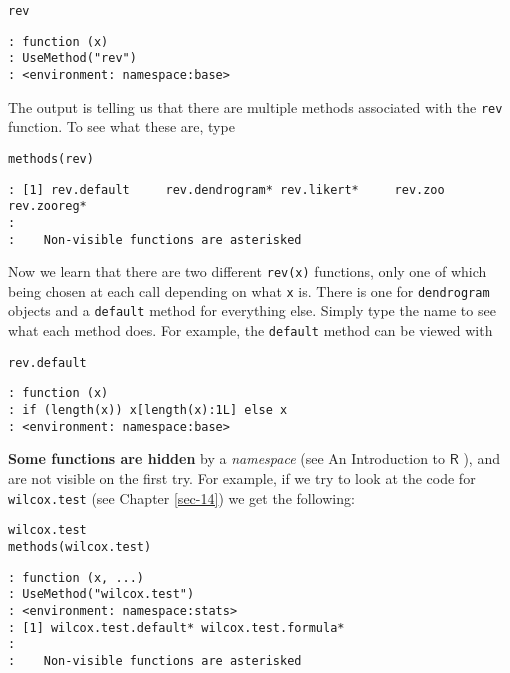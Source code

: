 \begin{verbatim}
rev
\end{verbatim}

\begin{verbatim}
: function (x) 
: UseMethod("rev")
: <environment: namespace:base>
\end{verbatim}

The output is telling us that there are multiple methods associated
with the \texttt{rev} function. To see what these are, type

\begin{verbatim}
methods(rev)
\end{verbatim}

\begin{verbatim}
: [1] rev.default     rev.dendrogram* rev.likert*     rev.zoo         rev.zooreg*    
: 
:    Non-visible functions are asterisked
\end{verbatim}

Now we learn that there are two different \texttt{rev(x)} functions, only one
of which being chosen at each call depending on what \texttt{x} is. There is
one for \texttt{dendrogram} objects and a \texttt{default} method for everything
else. Simply type the name to see what each method does. For example,
the \texttt{default} method can be viewed with

\begin{verbatim}
rev.default
\end{verbatim}

\begin{verbatim}
: function (x) 
: if (length(x)) x[length(x):1L] else x
: <environment: namespace:base>
\end{verbatim}

\textbf{Some functions are hidden} by a \emph{namespace} (see An Introduction to
\(\mathsf{R}\) \cite{Venables2010}), and are not visible on the first
try. For example, if we try to look at the code for \texttt{wilcox.test}
 (see Chapter \ref{sec-14}) we get the following:

\begin{verbatim}
wilcox.test
methods(wilcox.test)
\end{verbatim}

\begin{verbatim}
: function (x, ...) 
: UseMethod("wilcox.test")
: <environment: namespace:stats>
: [1] wilcox.test.default* wilcox.test.formula*
: 
:    Non-visible functions are asterisked
\end{verbatim}

